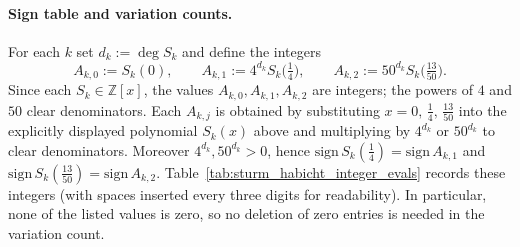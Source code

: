 \paragraph{Sign table and variation counts.}
For each $k$ set $d_k:=\deg S_k$ and define the integers
\begin{equation}
\label{eq:sturm_integer_defs}
A_{k,0}:=S_k(0),\qquad 
A_{k,1}:=4^{d_k}S_k\!\bigl(\tfrac14\bigr),\qquad 
A_{k,2}:=50^{d_k}S_k\!\bigl(\tfrac{13}{50}\bigr).
\end{equation}
Since each $S_k\in\mathbb Z[x]$, the values $A_{k,0},A_{k,1},A_{k,2}$ are integers; the powers of $4$ and $50$ clear denominators. Each $A_{k,j}$ is obtained by substituting $x=0,\,\tfrac14,\,\tfrac{13}{50}$ into the explicitly displayed polynomial $S_k(x)$ above and multiplying by $4^{d_k}$ or $50^{d_k}$ to clear denominators.
Moreover $4^{d_k},50^{d_k}>0$, hence $\mathrm{sign}\,S_k(\tfrac14)=\mathrm{sign}\,A_{k,1}$ and
$\mathrm{sign}\,S_k(\tfrac{13}{50})=\mathrm{sign}\,A_{k,2}$.
Table~\ref{tab:sturm_habicht_integer_evals} records these integers (with spaces inserted every three digits for readability).
In particular, none of the listed values is zero, so no deletion of zero entries is needed in the variation count.

